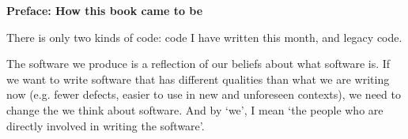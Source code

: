 \documentclass{book}
\begin{document}


\makeatletter
\renewcommand{\@pnumwidth}{2.75em}
\renewcommand{\@tocrmarg}{2.75em}
\makeatother
\tableofcontents
\vfill
\eject

\setcounter{chapter}{0} %

\frontmatter



\cleardoublepage
{}
{\bf {\Large Preface: How this book came to be}}

{\vbox {\vskip 0.3in}}

There is only two kinds of code: code I have written this month, and legacy code.


The software we produce is a reflection of our beliefs about what software is.
If we want to write software that has different qualities than what we are writing now (e.g. fewer defects, easier to use in new and unforeseen contexts), we need to change the we think about software. And by ‘we’, I mean ‘the people who are directly involved in writing the software’.
\end{document}
